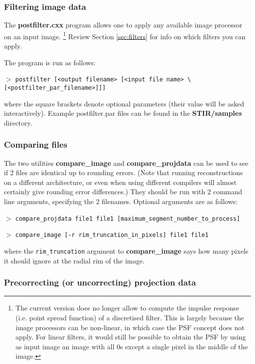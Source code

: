 \documentclass{article}
\newcommand{\cmdline}[1]{\par \noindent $>$ \texttt{#1}\par}
\begin{document}
{{{\subsubsection{
Filtering image data}

The \textbf{postfilter.cxx} program allows one to apply any available 
image processor on an input image. \footnote{{\small The current version 
does no longer allow to compute the impulse response (i.e. point 
spread function) of a discretised filter. This is largely because 
the image processors can be non-linear, in which case the PSF 
concept does not apply. For linear filters, it would still be 
possible to obtain the PSF by using as input image an image with 
all 0s except a single pixel in the middle of the image.}} Review 
Section \ref{sec:filters} for info on which filters you can apply.


The program is run as follows:
\cmdline{postfilter [\texttt{<}output filename\texttt{>} [\texttt{<}input file 
name\texttt{>} {\textbackslash}\\
{[}\texttt{<}postfilter\_par\_filename\texttt{>}]]]}

where the square brackets denote optional parameters (their value 
will be asked interactively). Example postfilter.par files can 
be found in the \textbf{STIR/samples} directory.


\subsubsection{
Comparing files}

The two utilities \textbf{compare\_image} and \textbf{compare\_projdata} 
can be used to see if 2 files are identical up to rounding errors. 
(Note that running reconstructions on a different architecture, 
or even when using different compilers will almost certainly 
give rounding error differences.) They should be run with 2 command 
line arguments, specifying the 2 filenames. Optional arguments 
are as follows:
\cmdline{compare\_projdata file1 file1 
[maximum\_segment\_number\_to\_process]}
\cmdline{compare\_image [-r rim\_truncation\_in\_pixels] file1 file1}


where the \texttt{rim\_truncation} argument to \textbf{compare\_image}  says 
how many pixels it should ignore at the radial rim of the image.



\subsubsection{
Precorrecting (or uncorrecting) projection data}

}}}
\end{document}

